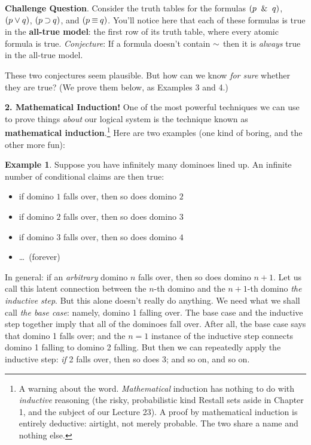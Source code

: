 \documentclass[options]{philosophersimprint}
\begin{document}
\textbf{Challenge Question}. Consider the truth tables for the formulas $(p \ \mathbin{\&} \  q)$, $(p \mathbin{\vee} q)$, $(p\mathbin{\supset} q)$, and $(p \mathbin{\equiv} q)$. You'll notice here that each of these formulas is true in the \textbf{all-true model}: the first row of its truth table, where every atomic formula is true. \textit{Conjecture}: If a formula doesn't contain $\mathord{\sim}$ then it is \textit{always} true in the all-true model.

These two conjectures seem plausible. But how can we know \textit{for sure} whether they are true? (We prove them below, as Examples 3 and 4.)

\textbf{2. Mathematical Induction!} One of the most powerful techniques we can use to prove things \textit{about} our logical system is the technique known as \textbf{mathematical induction}.\footnote{A warning about the word. \textit{Mathematical} induction has nothing to do with \textit{inductive} reasoning (the risky, probabilistic kind Restall sets aside in Chapter 1, and the subject of our Lecture 23). A proof by mathematical induction is entirely deductive: airtight, not merely probable. The two share a name and nothing else.} Here are two examples (one kind of boring, and the other more fun):

\textbf{Example 1}. Suppose you have infinitely many dominoes lined up. An infinite number of conditional claims are then true:
\begin{itemize}
    \item if domino $1$ falls over, then so does domino $2$
    \item if domino $2$ falls over, then so does domino $3$
    \item if domino $3$ falls over, then so does domino $4$
    \item \dots \ (forever)
\end{itemize}
In general: if an \textit{arbitrary} domino $n$ falls over, then so does domino $n+1$. Let us call this latent connection between the $n$-th domino and the $n+1$-th domino \textit{the inductive step}. But this alone doesn't really do anything. We need what we shall call \textit{the base case}: namely, domino 1 falling over. The base case and the inductive step together imply that all of the dominoes fall over. After all, the base case says that domino 1 falls over; and the $n=1$ instance of the inductive step connects domino 1 falling to domino 2 falling. But then we can repeatedly apply the inductive step: \textit{if} 2 falls over, then so does 3; and so on, and so on.
\end{document}
